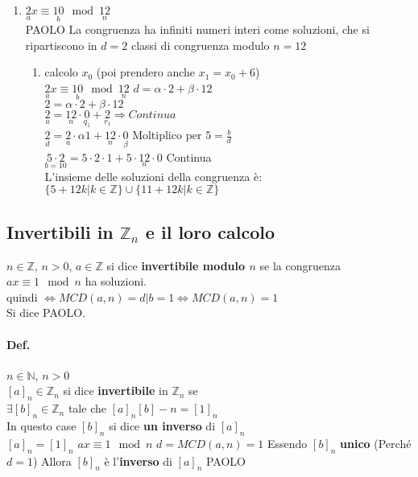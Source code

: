 \begin{enumerate}
\begin{enumerate}
        \end{enumerate}
    \item $\underset{a}{2}x\equiv\underset{b}{10}\mod\underset{n}{12}$\\
        {\color{purple} PAOLO}
        La congruenza ha infiniti numeri interi come soluzioni, che si ripartiscono in $d=2$ classi
        di congruenza modulo $n=12$\\
        \begin{enumerate}
            \item calcolo $x_0$ (poi prendero anche $x_1=x_0+6$)\\
                $\underset{a}{2}x\equiv\underset{b}{10}\mod\underset{n}{12}$
                $d=\alpha\cdot2+\beta\cdot 12$\\
                $2=\alpha\cdot2+\beta\cdot 12$\\
                $\underset{a}{2}=\underset{n}{12}\cdot\underset{q_1}{0}+\underset{r_1}{2}
                \Longrightarrow 
                Continua
                $\\
                $\underset{d}{2}=\underset{a}{2}\cdot {\alpha}{1}+\underset{n}{12}\cdot \underset{\beta}{0}$ Moltiplico per $5=\frac{b}{d}$\\
                $\underset{b=10}{5\cdot2}=5\cdot 2\cdot 1+5\cdot \underset{n}{12}\cdot 0$
                Continua\\
                L'insieme delle soluzioni della congruenza è:\\
                $\big\{ 5+12k|k\in\mathbb{Z}\big\}\cup\big\{11+12k|k\in\mathbb{Z}\big\}$

        \end{enumerate}


\end{enumerate}

\subsection{Invertibili in $\mathbb{Z}_n$ e il loro calcolo}
$n\in\mathbb{Z}$, $n>0$, $a\in\mathbb{Z}$ si dice \textbf{invertibile modulo $n$}
se la congruenza $ax\equiv 1\mod n$ ha soluzioni.\\
{\color{blue} quindi $\Longleftrightarrow MCD(a,n)=d|b=1\Longleftrightarrow MCD(a,n)=1$\\
Si dice {\color{purple} PAOLO}.}
\paragraph{Def.} $n\in\mathbb{N}$, $n>0$\\
$[a]_n\in\mathbb{Z}_n$ si dice \textbf{invertibile} in $\mathbb{Z}_n$ se \\
$\exists [b]_n\in\mathbb{Z}_n$ tale che $[a]_n[b]-n=[1]_n$\\
In questo case $[b]_n$ si dice \textbf{un inverso} di $[a]_n$\\
$[a]_n=[1]_n$
$ax\equiv 1\mod n$
$d=MCD(a,n)=1$
Essendo $[b]_n$ \textbf{unico}
(Perché $d=1$) Allora $[b]_n$ è l'\textbf{inverso} di $[a]_n$
    {\color{purple} PAOLO}

